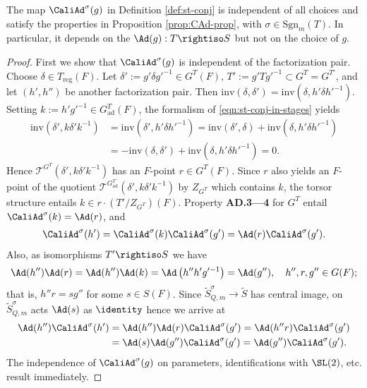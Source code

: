 \documentclass[a4paper,10pt]{article}
\begin{document}
\begin{theorem}
	The map $\CaliAd^\sigma(g)$ in Definition \ref{def:st-conj} is independent of all choices and satisfy the properties in Proposition \ref{prop:CAd-prop}, with $\sigma \in \mathrm{Sgn}_m(T)$. In particular, it depends on the $\Ad(g): T \rightiso S$ but not on the choice of $g$.
\end{theorem}
\begin{proof}
	First we show that $\CaliAd^\sigma(g)$ is independent of the factorization pair. Choose $\delta \in T_\text{reg}(F)$. Let $\delta' := g'\delta g'^{-1} \in G^T(F)$, $T' := g' T g'^{-1} \subset G^T = G^{T'}$, and let $(h', h'')$ be another factorization pair. Then $\text{inv}(\delta, \delta') = \text{inv}(\delta, h' \delta h'^{-1})$. Setting $k := h' g'^{-1} \in G^T_\text{ad}(F)$, the formalism of \eqref{eqn:st-conj-in-stages} yields
	\begin{align*}
		\text{inv}(\delta', k \delta' k^{-1}) & = \text{inv}(\delta', h'\delta h'^{-1}) = \text{inv}(\delta', \delta) + \text{inv}(\delta, h'\delta h'^{-1}) \\
		& = -\text{inv}(\delta, \delta') + \text{inv}(\delta, h'\delta h'^{-1}) = 0.
	\end{align*}
	Hence $\mathcal{T}^{G^T}(\delta', k\delta' k^{-1})$ has an $F$-point $r \in G^T(F)$. Since $r$ also yields an $F$-point of the quotient $\mathcal{T}^{G^T_\text{ad}}(\delta', k\delta' k^{-1})$ by $Z_{G^T}$ which contains $k$, the torsor structure entails $k \in r \cdot (T'/Z_{G^T})(F)$. Property \textbf{AD.3---4} for $G^T$ entail $\CaliAd^\sigma(k) = \Ad(r)$, and
	\begin{gather*}
		\CaliAd^\sigma(h') = \CaliAd^\sigma(k) \CaliAd^\sigma(g') = \Ad(r) \CaliAd^\sigma(g').
	\end{gather*}
	Also, as isomorphisms $T' \rightiso S$ we have
	\[ \Ad(h'')\Ad(r) = \Ad(h'') \Ad(k) = \Ad\left( h'' h' g'^{-1} \right) = \Ad(g''), \quad h'', r, g'' \in G(F); \]
	that is, $h'' r = s g''$ for some $s \in S(F)$. Since $\tilde{S}^\sigma_{Q,m} \to \tilde{S}$ has central image, on $\tilde{S}^\sigma_{Q,m}$ acts $\Ad(s)$ as $\identity$ hence we arrive at
	\begin{align*}
		\Ad(h'') \CaliAd^\sigma(h') &= \Ad(h'') \Ad(r) \CaliAd^\sigma(g') = \Ad(h'' r) \CaliAd^\sigma(g') \\
		& = \Ad(s) \Ad(g'') \CaliAd^\sigma(g') = \Ad(g'') \CaliAd^\sigma(g').
	\end{align*}
	The independence of $\CaliAd^\sigma(g)$ on parameters, identifications with $\SL(2)$, etc. result immediately.


\end{proof}
\end{document}
